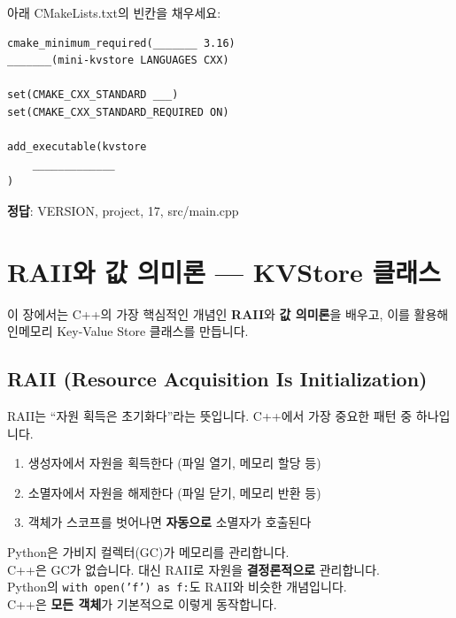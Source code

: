 \documentclass[11pt,a4paper]{book}
\newcommand{\code}[1]{\texttt{#1}}
\begin{document}
\begin{quizbox}
아래 CMakeLists.txt의 빈칸을 채우세요:

\begin{lstlisting}[style=cmake,numbers=none]
cmake_minimum_required(_______ 3.16)
_______(mini-kvstore LANGUAGES CXX)

set(CMAKE_CXX_STANDARD ___)
set(CMAKE_CXX_STANDARD_REQUIRED ON)

add_executable(kvstore
    _____________
)
\end{lstlisting}

\textbf{정답}: VERSION, project, 17, src/main.cpp
\end{quizbox}

\chapter{RAII와 값 의미론 — KVStore 클래스}
\label{ch:raii}

이 장에서는 C++의 가장 핵심적인 개념인 \textbf{RAII}와 \textbf{값 의미론}을 배우고, 이를 활용해 인메모리 Key-Value Store 클래스를 만듭니다.

\section{RAII (Resource Acquisition Is Initialization)}

RAII는 ``자원 획득은 초기화다''라는 뜻입니다. C++에서 가장 중요한 패턴 중 하나입니다.

\begin{conceptbox}[title={RAII 핵심 원리}]
\begin{enumerate}
\item 생성자에서 자원을 획득한다 (파일 열기, 메모리 할당 등)
\item 소멸자에서 자원을 해제한다 (파일 닫기, 메모리 반환 등)
\item 객체가 스코프를 벗어나면 \textbf{자동으로} 소멸자가 호출된다
\end{enumerate}
\end{conceptbox}

\begin{pythonbox}
Python은 가비지 컬렉터(GC)가 메모리를 관리합니다.\\
C++은 GC가 없습니다. 대신 RAII로 자원을 \textbf{결정론적으로} 관리합니다.\\[6pt]
Python의 \code{with open('f') as f:}도 RAII와 비슷한 개념입니다.\\
C++은 \textbf{모든 객체}가 기본적으로 이렇게 동작합니다.
\end{pythonbox}
\end{document}
